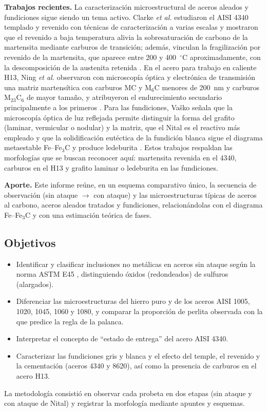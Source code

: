 \documentclass[journal,11pt]{IEEEtran}
\newcommand{\FeFeC}{Fe--Fe$_3$C}
\begin{document}
\textbf{Trabajos recientes.} La caracterización microestructural de aceros aleados y fundiciones sigue siendo un tema activo. Clarke \textit{et al.} estudiaron el AISI 4340 templado y revenido con técnicas de caracterización a varias escalas y mostraron que el revenido a baja temperatura alivia la sobresaturación de carbono de la martensita mediante carburos de transición; además, vinculan la fragilización por revenido de la martensita, que aparece entre 200 y 400~$^{\circ}$C aproximadamente, con la descomposición de la austenita retenida \cite{clarke}. En el acero para trabajo en caliente H13, Ning \textit{et al.} observaron con microscopía óptica y electrónica de transmisión una matriz martensítica con carburos MC y M$_6$C menores de 200~nm y carburos M$_{23}$C$_6$ de mayor tamaño, y atribuyeron el endurecimiento secundario principalmente a los primeros \cite{ning}. Para las fundiciones, Vaško señala que la microscopía óptica de luz reflejada permite distinguir la forma del grafito (laminar, vermicular o nodular) y la matriz, que el Nital es el reactivo más empleado y que la solidificación eutéctica de la fundición blanca sigue el diagrama metaestable \FeFeC{} y produce ledeburita \cite{vasko}. Estos trabajos respaldan las morfologías que se buscan reconocer aquí: martensita revenida en el 4340, carburos en el H13 y grafito laminar o ledeburita en las fundiciones.

\textbf{Aporte.} Este informe reúne, en un esquema comparativo único, la secuencia de observación (sin ataque $\rightarrow$ con ataque) y las microestructuras típicas de aceros al carbono, aceros aleados tratados y fundiciones, relacionándolas con el diagrama \FeFeC{} y con una estimación teórica de fases.

\subsection{Objetivos}
\begin{itemize}
    \item Identificar y clasificar inclusiones no metálicas en aceros sin ataque según la norma ASTM E45 \cite{astm_e45}, distinguiendo óxidos (redondeados) de sulfuros (alargados).
    \item Diferenciar las microestructuras del hierro puro y de los aceros AISI 1005, 1020, 1045, 1060 y 1080, y comparar la proporción de perlita observada con la que predice la regla de la palanca.
    \item Interpretar el concepto de ``estado de entrega'' del acero AISI 4340.
    \item Caracterizar las fundiciones gris y blanca \cite{astm_a247} y el efecto del temple, el revenido y la cementación (aceros 4340 y 8620), así como la presencia de carburos en el acero H13.
\end{itemize}
La metodología consistió en observar cada probeta en dos etapas (sin ataque y con ataque de Nital) y registrar la morfología mediante apuntes y esquemas.
\end{document}
